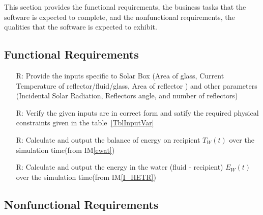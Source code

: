\documentclass[12pt]{article}
\newcommand{\iref}[1]{IM\ref{#1}}
\newcounter{reqnum} %
\begin{document}
This section provides the functional requirements, the business tasks that the
software is expected to complete, and the nonfunctional requirements, the
qualities that the software is expected to exhibit.

\subsection{Functional Requirements}

\noindent \begin{itemize}

\item[R\refstepcounter{reqnum}\thereqnum \label{R_Inputs}:] Provide the inputs specific to Solar Box (Area of glass, Current Temperature of reflector/fluid/glass, Area of reflector ) and other parameters (Incidental Solar Radiation, Reflectors angle, and number of reflectors)

\item[R\refstepcounter{reqnum}\thereqnum \label{R_VerifyOutput}:]
  Verify the given inputs are in correct form and satify the required physical constraints given in the table~\ref{TblInputVar}

\item[R\refstepcounter{reqnum}\thereqnum \label{R_Calculate}:] Calculate and output the balance of energy on recipient $T_W(t)$ over the simulation time(from \iref{ewat})

\item[R\refstepcounter{reqnum}\thereqnum \label{R_Output}:] Calculate and output the energy in the water (fluid - recipient) $E_W(t)$ over the simulation time(from \iref{I_HETR})

\end{itemize}


\subsection{Nonfunctional Requirements}


\noindent 
\end{document}

